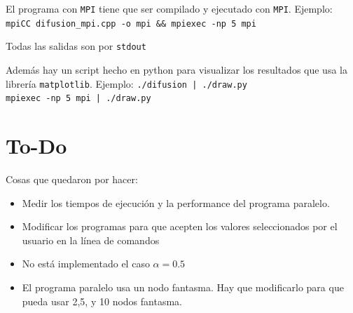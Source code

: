 \documentclass[12pt, a4paper]{article}
\begin{document}
			El programa con \texttt{MPI} tiene que ser compilado y ejecutado con \texttt{MPI}.
			Ejemplo: \texttt{mpiCC difusion\_mpi.cpp -o mpi \&\& mpiexec -np 5 mpi}
			
			Todas las salidas son por \texttt{stdout}
			
			Además hay un script hecho en python para visualizar los resultados que usa la librería \texttt{matplotlib}.
			Ejemplo: \texttt{./difusion | ./draw.py}\\
			\texttt{mpiexec -np 5 mpi | ./draw.py}
		
		\section{To-Do}
			Cosas que quedaron por hacer:
			\begin{itemize}
				\item Medir los tiempos de ejecución y la performance del programa paralelo.
				\item Modificar los programas para que acepten los valores seleccionados por el usuario en la línea de comandos
				\item No está implementado el caso $\alpha=0.5$
				\item El programa paralelo usa un nodo fantasma. Hay que modificarlo para que pueda usar 2,5, y 10 nodos fantasma.
			\end{itemize}
\end{document}
